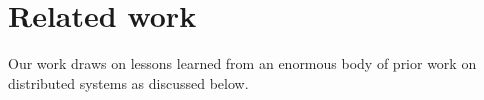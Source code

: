 %





\vspace{-0.1in}
\section{Related work}
\label{sec:related}


Our work draws on lessons learned from an enormous body of prior work on distributed systems as discussed below.


